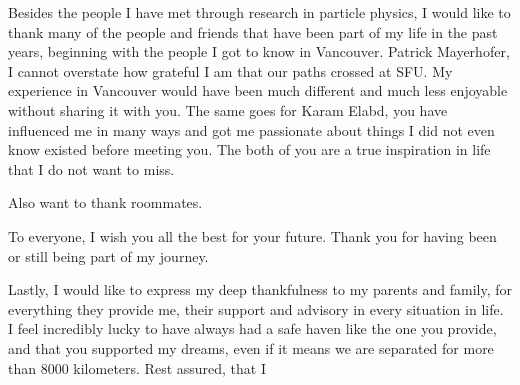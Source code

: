 Besides the people I have met through research in particle physics, I would like to thank many of the people and friends that have been part of my life in the past years, beginning with the people I got to know in Vancouver. 
Patrick Mayerhofer, I cannot overstate how grateful I am that our paths crossed at SFU. My experience in Vancouver would have been much different and much less enjoyable without sharing it with you. 
The same goes for Karam Elabd, you have influenced me in many ways and got me passionate about things I did not even know existed before meeting you.
The both of you are a true inspiration in life that I do not want to miss. 



Also want to thank roommates.

To everyone, I wish you all the best for your future. Thank you for having been or still being part of my journey. 

Lastly, I would like to express my deep thankfulness to my parents and family, for everything they provide me, their support and advisory in every situation in life. 
I feel incredibly lucky to have always had a safe haven like the one you provide, and that you supported my dreams, even if it means we are separated for more than 8000 kilometers. Rest assured, that I 